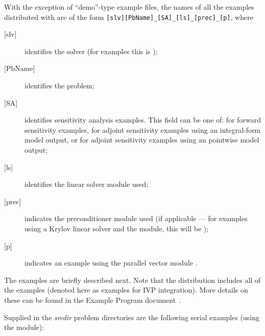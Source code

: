 \vspace{0.2in}\noindent
With the exception of ``demo''-type example files, the names of all the examples 
distributed with {\sundials} are of the form \verb![slv][PbName]_[SA]_[ls]_[prec]_[p]!, 
where
\begin{description}
\item [{[slv]}] identifies the solver (for {\idas} examples this is );
\item [{[PbName]}] identifies the problem;
\item [{[SA]}] identifies sensitivity analysis examples. This field can be one
  of:  for forward sensitivity examples,  for adjoint sensitivity
  examples using an integral-form model output, or  for adjoint sensitivity
  examples using an pointwise model output;
\item [{[ls]}] identifies the linear solver module used;
\item [{[prec]}] indicates the {\idas} preconditioner module used
  (if applicable --- for examples using a Krylov linear solver
  and the {\idabbdpre} module, this will be );
\item [{[p]}] indicates an example using the parallel vector module {\nvecp}.
\end{description}

\vspace{0.2in}\noindent
The examples are briefly described next.
Note that the {\idas} distribution includes all of the {\ida} {\CC}
examples (denoted here as examples for IVP integration). More details on
these can be found in the {\ida} Example Program document~\cite{ida_ex}.


\vspace{0.2in}\noindent
Supplied in the {\em srcdir} problem directories are the
following serial examples (using the {\nvecs} module):

